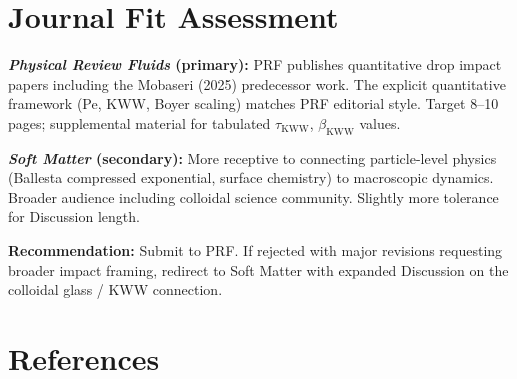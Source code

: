 \documentclass[11pt,letterpaper]{article}
\newcommand{\taukww}{\tau_{\mathrm{KWW}}}
\newcommand{\bkww}{\beta_{\mathrm{KWW}}}
\begin{document}
\section{Journal Fit Assessment}

\textbf{\textit{Physical Review Fluids} (primary):}
PRF publishes quantitative drop impact papers including the Mobaseri (2025)
predecessor work. The explicit quantitative framework (Pe, KWW, Boyer scaling)
matches PRF editorial style. Target 8--10 pages; supplemental material for
tabulated $\taukww$, $\bkww$ values.

\textbf{\textit{Soft Matter} (secondary):}
More receptive to connecting particle-level physics (Ballesta compressed
exponential, surface chemistry) to macroscopic dynamics. Broader audience
including colloidal science community. Slightly more tolerance for Discussion
length.

\textbf{Recommendation:} Submit to PRF. If rejected with major revisions
requesting broader impact framing, redirect to Soft Matter with expanded
Discussion on the colloidal glass / KWW connection.

\section*{References}
\end{document}
